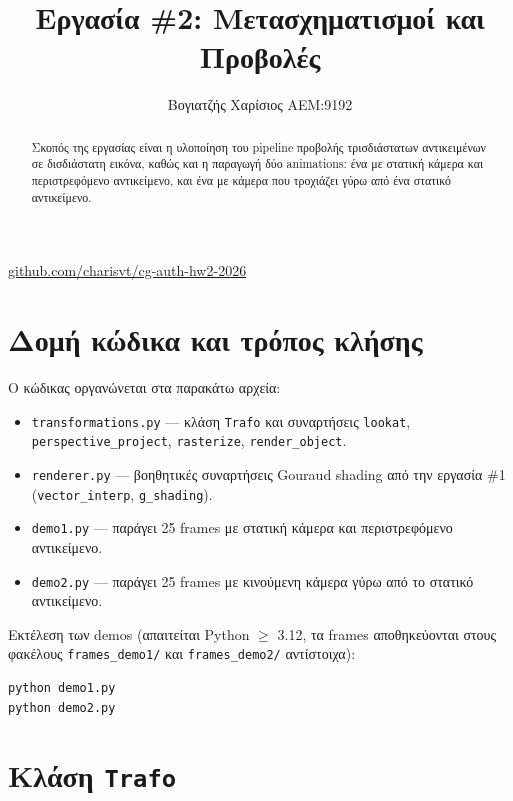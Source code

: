 \documentclass{article}
\title{Εργασία \#2: Μετασχηματισμοί και Προβολές}
\author{Βογιατζής Χαρίσιος ΑΕΜ:9192}
\begin{document}
\maketitle

\begin{center}
\href{https://github.com/charisvt/cg-auth-hw2-2026}{github.com/charisvt/cg-auth-hw2-2026}
\end{center}

\begin{abstract}
Σκοπός της εργασίας είναι η υλοποίηση του pipeline προβολής τρισδιάστατων αντικειμένων σε
δισδιάστατη εικόνα, καθώς και η παραγωγή δύο animations: ένα με στατική κάμερα και
περιστρεφόμενο αντικείμενο, και ένα με κάμερα που τροχιάζει γύρω από ένα στατικό αντικείμενο.
\end{abstract}

\section{Δομή κώδικα και τρόπος κλήσης}

Ο κώδικας οργανώνεται στα παρακάτω αρχεία:
\begin{itemize}
  \item \texttt{transformations.py} --- κλάση \texttt{Trafo} και συναρτήσεις
        \texttt{lookat}, \texttt{perspective\_project}, \texttt{rasterize},
        \texttt{render\_object}.
  \item \texttt{renderer.py} --- βοηθητικές συναρτήσεις Gouraud shading από
        την εργασία \#1 (\texttt{vector\_interp}, \texttt{g\_shading}).
  \item \texttt{demo1.py} --- παράγει 25 frames με στατική κάμερα και
        περιστρεφόμενο αντικείμενο.
  \item \texttt{demo2.py} --- παράγει 25 frames με κινούμενη κάμερα γύρω από
        το στατικό αντικείμενο.
\end{itemize}

Εκτέλεση των demos (απαιτείται Python $\geq$ 3.12, τα frames αποθηκεύονται στους
φακέλους \texttt{frames\_demo1/} και \texttt{frames\_demo2/} αντίστοιχα):
\begin{lstlisting}
python demo1.py
python demo2.py
\end{lstlisting}

\section{Κλάση \texttt{Trafo}}
\end{document}
